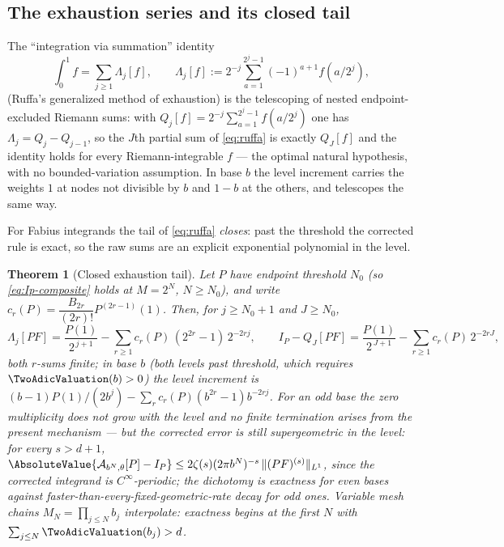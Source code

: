 \documentclass[11pt,oneside]{article}
\numberwithin{equation}{section}
\newtheorem{theorem}{Theorem}[section]
\theoremstyle{definition}
\theoremstyle{remark}
\begin{document}
\subsection{The exhaustion series and its closed tail}

The ``integration via summation'' identity
\begin{equation}
 \int_0^1f=\sum_{j\ge1}\Lambda_j[f],
 \qquad
 \Lambda_j[f]:=2^{-j}\sum_{a=1}^{2^{j}-1}(-1)^{a+1}f(a/2^{j}),
 \label{eq:ruffa}
\end{equation}
(Ruffa's generalized method of exhaustion) is the telescoping of
nested endpoint-excluded Riemann sums: with
$Q_j[f]=2^{-j}\sum_{a=1}^{2^{j}-1}f(a/2^{j})$ one has
$\Lambda_j=Q_j-Q_{j-1}$, so the $J$th partial sum of \eqref{eq:ruffa}
is exactly $Q_J[f]$ and the identity holds for every Riemann-integrable
$f$ --- the optimal natural hypothesis, with no bounded-variation
assumption.  In base $b$ the level increment carries the weights $1$ at
nodes not divisible by $b$ and $1-b$ at the others, and telescopes the
same way.

For Fabius integrands the tail of \eqref{eq:ruffa} \emph{closes}: past
the threshold the corrected rule is exact, so the raw sums are an
explicit exponential polynomial in the level.

\begin{theorem}[Closed exhaustion tail]
\label{thm:ruffa-tail}
Let $P$ have endpoint threshold $N_0$ (so
\eqref{eq:Ip-composite} holds at $M=2^{N}$, $N\ge N_0$), and write
$c_r(P)=\dfrac{B_{2r}}{(2r)!}P^{(2r-1)}(1)$.  Then, for $j\ge N_0+1$
and $J\ge N_0$,
\begin{equation}
 \Lambda_j[PF]
 =\frac{P(1)}{2^{\,j+1}}
 -\sum_{r\ge1}c_r(P)\,(2^{2r}-1)\,2^{-2rj},
 \qquad
 I_P-Q_J[PF]
 =\frac{P(1)}{2^{\,J+1}}-\sum_{r\ge1}c_r(P)\,2^{-2rJ},
 \label{eq:closed-tail}
\end{equation}
both $r$-sums finite; in base $b$ (both levels past threshold, which
requires $\TwoAdicValuation(b)>0$) the level increment is
$(b-1)P(1)/(2b^{j})-\sum_rc_r(P)(b^{2r}-1)b^{-2rj}$.  For an odd base
the zero multiplicity does not grow with the level and no finite
termination arises from the present mechanism --- but the corrected
error is still \emph{supergeometric} in the level: for every
$s>d+1$,
$\AbsoluteValue{\mathcal A_{b^{N},\theta}[P]-I_P}
\le 2\zeta(s)(2\pi b^{N})^{-s}\,\lVert(PF)^{(s)}\rVert_{L^1}$,
since the corrected integrand is $C^\infty$-periodic; the dichotomy
is exactness for even bases against
faster-than-every-fixed-geometric-rate decay for odd ones.  Variable
mesh chains $M_N=\prod_{j\le N}b_j$ interpolate: exactness begins at
the first $N$ with $\sum_{j\le N}\TwoAdicValuation(b_j)>d$.
\end{theorem}
\end{document}
